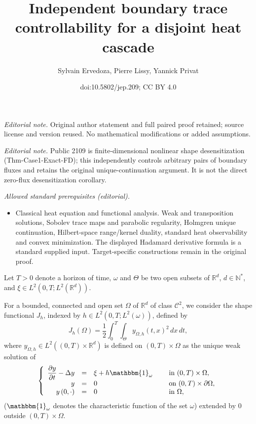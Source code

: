 \documentclass[10pt,a4paper]{amsart}
\title{Independent boundary trace controllability for a disjoint heat cascade}
\author{Sylvain Ervedoza, Pierre Lissy, Yannick Privat}
\date{doi:10.5802/jep.209; CC BY 4.0}
\newcommand\R{{\mathbb R}}
\theoremstyle{definition}
\begin{document}
\maketitle
\noindent\textit{Editorial note.} Original author statement and full paired proof retained; source license and version reused. No mathematical modifications or added assumptions.\par\medskip
\noindent\textit{Editorial note.} Public 2109 is finite-dimensional nonlinear shape desensitization (Thm-Case1-Exact-FD); this independently controls arbitrary pairs of boundary fluxes and retains the original unique-continuation argument. It is not the direct zero-flux desensitization corollary.\par\medskip
\noindent\textit{Allowed standard prerequisites (editorial).}\begin{itemize}
\item Classical heat equation and functional analysis. Weak and transposition solutions, Sobolev trace maps and parabolic regularity, Holmgren unique continuation, Hilbert-space range/kernel duality, standard heat observability and convex minimization. The displayed Hadamard derivative formula is a standard supplied input. Target-specific constructions remain in the original proof.
\end{itemize}\medskip
Let $T>0$ denote a horizon of time, $\omega$ and $\Theta$ be two open subsets of $\R^d$, $d\in\mathbb N^*$, and $\xi \in L^2(0,T; L^2(\R^d))$.

For a bounded, connected and open set $\Omega$ of $\mathbb{R}^d$ of class $\mathscr{C}^2$, we consider the shape functional $J_h$, indexed by $h \in L^2(0,T; L^2(\omega))$, defined by
\begin{equation}
\label{def-J}
J_h(\Omega) = \dfrac{1}{2}\int_{0}^{T} \int_{\Theta}y_{\Omega,h}(t,x)^{2}\, dx\,dt,
\end{equation}
where $y_{\Omega,h}\in L^2((0,T)\times \mathbb R^d)$ is defined on $(0,T)\times\Omega$ as the unique weak solution of
\begin{equation}
\label{y-Omega-h}
\left\{
\begin{array}{rcll}
\dfrac{\partial y}{\partial t}-\Delta y &=&\xi +h\mathbbm{1}_{\omega}\quad&\text{ in }(0,T) \times \Omega,
\\
y&=& 0 &\text{ on }(0,T) \times \partial \Omega,
\\
y\left(0,\cdot\right) &=& 0 &\text{ in }\Omega,
\end{array}
\right.
\end{equation}
($\mathbbm{1}_\omega$ denotes the characteristic function of the set $\omega$) extended by $0$ outside $(0,T) \times \Omega$.
\end{document}
